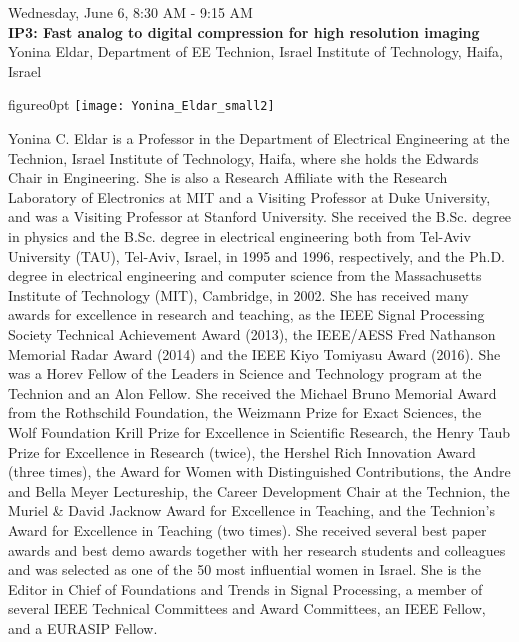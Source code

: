 \newpage\vspace{2cm}
\begin{center}{\Large{
Wednesday, June 6, 8:30 AM - 9:15 AM \\
\textbf{IP3: Fast analog to digital compression for high resolution imaging}\\
Yonina Eldar, Department of EE Technion, Israel Institute of Technology, Haifa, Israel
}}\end{center}
\vspace{1cm}


\begin{wrapfloat}{figure}{o}{0pt}
\texttt{[image: Yonina\_Eldar\_small2]}
\end{wrapfloat}
Yonina C. Eldar is a Professor in the Department of Electrical Engineering at the Technion, Israel Institute of Technology, Haifa, where she holds the Edwards Chair in Engineering. 
She is also a Research Affiliate with the Research Laboratory of Electronics at MIT and a Visiting Professor at Duke University, and was a Visiting Professor at Stanford University. 
She received the B.Sc. degree in physics and the B.Sc. degree in electrical engineering both from Tel-Aviv University (TAU), Tel-Aviv, Israel, in 1995 and 1996, respectively, and the Ph.D. degree in electrical engineering and computer science from the Massachusetts Institute of Technology (MIT), Cambridge, in 2002.
She has received many awards for excellence in research and teaching, as
the IEEE Signal Processing Society Technical Achievement Award (2013), the IEEE/AESS Fred Nathanson Memorial Radar Award (2014) and the IEEE Kiyo Tomiyasu Award (2016).
She was a Horev Fellow of the Leaders in Science and Technology program at the Technion and an Alon Fellow. 
She received the Michael Bruno Memorial Award from the Rothschild Foundation, the Weizmann Prize for Exact Sciences, the Wolf Foundation Krill Prize for Excellence in Scientific Research, the Henry Taub Prize for Excellence in Research (twice), the Hershel Rich Innovation Award (three times), the Award for Women with Distinguished Contributions, the Andre and Bella Meyer Lectureship, the Career Development Chair at the Technion, the Muriel \& David Jacknow Award for Excellence in Teaching, and the Technion's Award for Excellence in Teaching (two times). 
She received several best paper awards and best demo awards together with her research students and colleagues and was selected as one of the 50 most influential women in Israel.
She is the Editor in Chief of Foundations and Trends in Signal Processing, a member of several IEEE Technical Committees and Award Committees, an IEEE Fellow, and a EURASIP Fellow.
